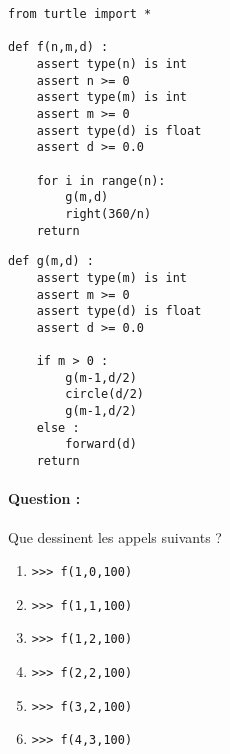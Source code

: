 \documentclass[11pt,a4paper]{article}
\begin{document}
\noindent
\begin{minipage}[t]{7cm}\footnotesize
\begin{lstlisting}
from turtle import *

def f(n,m,d) :
    assert type(n) is int
    assert n >= 0
    assert type(m) is int
    assert m >= 0
    assert type(d) is float
    assert d >= 0.0
    
    for i in range(n):
        g(m,d)
        right(360/n)
    return
\end{lstlisting}
\end{minipage}
\hfill
\begin{minipage}[t]{7cm}\footnotesize
\begin{lstlisting}
def g(m,d) :
    assert type(m) is int
    assert m >= 0
    assert type(d) is float
    assert d >= 0.0
    
    if m > 0 :
        g(m-1,d/2)
        circle(d/2)
        g(m-1,d/2)
    else :
        forward(d)
    return
\end{lstlisting}
\end{minipage}
\vspace*{2mm}

\paragraph{Question :}
Que dessinent les appels suivants ?\\
\begin{minipage}[t]{5cm}
\begin{enumerate}
\item \texttt{>{>}> f(1,0,100)}
\item \texttt{>{>}> f(1,1,100)}
\end{enumerate}
\end{minipage}
\hfill
\begin{minipage}[t]{5cm}
\begin{enumerate}\setcounter{enumi}{2}
\item \texttt{>{>}> f(1,2,100)}
\item \texttt{>{>}> f(2,2,100)}
\end{enumerate}
\end{minipage}
\hfill
\begin{minipage}[t]{5cm}
\begin{enumerate}\setcounter{enumi}{4}
\item \texttt{>{>}> f(3,2,100)}
\item \texttt{>{>}> f(4,3,100)}
\end{enumerate}
\end{minipage}
\end{document}
